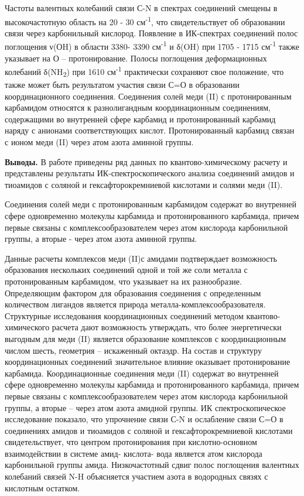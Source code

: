 Частоты валентных колебаний связи С-N в спектрах соединений смещены в
высокочастотную область на 20 - 30 см\textsuperscript{-1}, что
свидетельствует об образовании связи через карбонильный кислород.
Появление в ИК-спектрах соединений полос поглощения ν(ОH) в области
3380- 3390 см\textsuperscript{-1} и δ(OH) при 1705 - 1715
см\textsuperscript{-1} также указывает на О -- протонирование. Полосы
поглощения деформационных колебаний δ(NH\textsubscript{2}) при 1610
см\textsuperscript{-1} практически сохраняют свое положение, что также
может быть результатом участия связи С=О в образовании координационного
соединения. Соединения солей меди (II) с протонированным карбамидом
относятся к разнолигандным координационным соединениям, содержащими во
внутренней сфере карбамид и протонированный карбамид наряду с анионами
соответствующих кислот. Протонированный карбамид связан с ионом меди
(II) через атом азота аминной группы.

\textbf{Выводы.} В работе приведены ряд данных по квантово-химическому
расчету и представлены результаты ИК-спектроскопического анализа
соединений амидов и тиоамидов с соляной и гексафторокремниевой кислотами
и солями меди (II).

Соединения солей меди с протонированным карбамидом содержат во
внутренней сфере одновременно молекулы карбамида и протонированного
карбамида, причем первые связаны с комплексообразователем через атом
кислорода карбонильной группы, а вторые - через атом азота аминной
группы.

Данные расчеты комплексов меди (II)с амидами подтверждает возможность
образования нескольких соединений одной и той же соли металла с
протонированным карбамидом, что указывает на их разнообразие.
Определяющим фактором для образования соединения с определенным
количеством лигандов является природа металла-комплексообразователя.
Структурные исследования координационных соединений методом
квантово-химического расчета дают возможность утверждать, что более
энергетически выгодным для меди (II) является образование комплексов с
координационным числом шесть, геометрия -- искаженный октаэдр. На состав
и структуру координационных соединений значительное влияние оказывает
протонирование карбамида. Координационные соединения меди (II) содержат
во внутренней сфере одновременно молекулы карбамида и протонированного
карбамида, причем первые связаны с комплексообразователем через атом
кислорода карбонильной группы, а вторые -- через атом азота амидной
группы. ИК спектроскопическое исследование показало, что упрочнение
связи С-N и ослабление связи С=О в соединениях амидов и тиоамидов с
соляной и гексафторокремниевой кислотами свидетельствует, что центром
протонирования при кислотно-основном взаимодействии в системе амид-
кислота- вода является атом кислорода карбонильной группы амида.
Низкочастотный сдвиг полос поглощения валентных колебаний связей N-H
объясняется участием азота в водородных связях с кислотным остатком.

